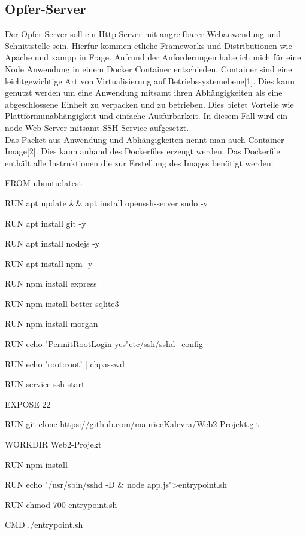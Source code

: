 \documentclass[12pt]{article}
\begin{document}
\subsection{Opfer-Server}
Der Opfer-Server soll ein Http-Server mit angreifbarer Webanwendung und Schnittstelle sein. Hierfür kommen etliche Frameworks und Distributionen wie Apache und xampp in Frage.
Aufrund der Anforderungen habe ich mich für eine Node Anwendung in einem Docker Container entschieden.
Container sind eine leichtgewichtige Art von Virtualisierung auf Betriebssystemebene[1]. Dies kann genutzt werden um eine Anwendung mitsamt ihren Abhängigkeiten als eine abgeschlossene Einheit zu verpacken und zu betrieben. Dies bietet Vorteile wie Plattformunabhängigkeit und einfache Ausfürbarkeit. In diesem Fall wird ein node Web-Server mitsamt SSH Service aufgesetzt.\\
Das Packet aus Anwendung und Abhängigkeiten
nennt man auch Container-Image[2]. Dies kann anhand des Dockerfiles erzeugt werden. Das Dockerfile enthält alle Instruktionen die zur Erstellung des Images benötigt werden.  \\
\begin{shaded}
\begin{internallinenumbers}
FROM ubuntu:latest

RUN apt update \&\& apt install  openssh-server sudo -y

RUN apt install git -y

RUN apt install nodejs -y

RUN apt install npm -y

RUN npm install express

RUN npm install better-sqlite3

RUN npm install morgan

RUN echo "PermitRootLogin yes"\>etc/ssh/sshd\_config

RUN  echo 'root:root' | chpasswd

RUN service ssh start

EXPOSE 22

RUN git clone https://github.com/mauriceKalevra/Web2-Projekt.git

WORKDIR Web2-Projekt

RUN npm install

RUN echo  "/usr/sbin/sshd -D \& node app.js">entrypoint.sh

RUN chmod 700 entrypoint.sh

CMD ./entrypoint.sh
\end{internallinenumbers}
\end{shaded}
\end{document}
